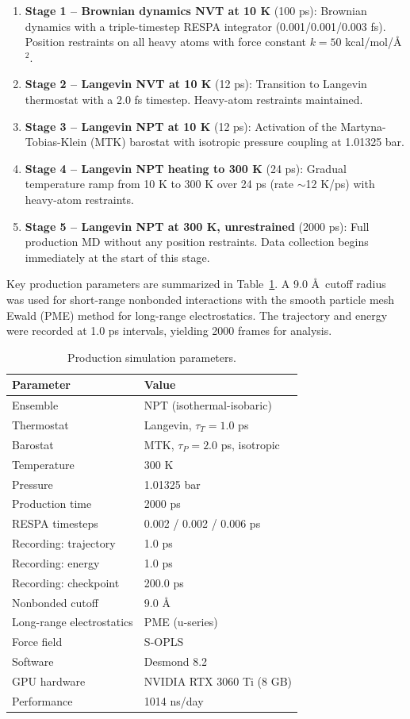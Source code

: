 \documentclass[twocolumn,10pt]{article}
\begin{document}
\begin{enumerate}[nosep]
    \item \textbf{Stage 1 -- Brownian dynamics NVT at 10 K} (100 ps): Brownian dynamics with a triple-timestep RESPA integrator (0.001/0.001/0.003 fs). Position restraints on all heavy atoms with force constant $k = 50$ kcal/mol/\AA$^2$.
    \item \textbf{Stage 2 -- Langevin NVT at 10 K} (12 ps): Transition to Langevin thermostat with a 2.0 fs timestep. Heavy-atom restraints maintained.
    \item \textbf{Stage 3 -- Langevin NPT at 10 K} (12 ps): Activation of the Martyna-Tobias-Klein (MTK) barostat with isotropic pressure coupling at 1.01325 bar.
    \item \textbf{Stage 4 -- Langevin NPT heating to 300 K} (24 ps): Gradual temperature ramp from 10 K to 300 K over 24 ps (rate $\sim$12 K/ps) with heavy-atom restraints.
    \item \textbf{Stage 5 -- Langevin NPT at 300 K, unrestrained} (2000 ps): Full production MD without any position restraints. Data collection begins immediately at the start of this stage.
\end{enumerate}

Key production parameters are summarized in Table~\ref{tab:params}. A 9.0 \AA\ cutoff radius was used for short-range nonbonded interactions with the smooth particle mesh Ewald (PME) method for long-range electrostatics. The trajectory and energy were recorded at 1.0 ps intervals, yielding 2000 frames for analysis.

\begin{table}[!ht]
\centering
\caption{Production simulation parameters.}
\label{tab:params}
\begin{tabular}{p{}p{}}
\toprule
Parameter & Value \\
\midrule
Ensemble & NPT (isothermal-isobaric) \\
Thermostat & Langevin, $\tau_T = 1.0$ ps \\
Barostat & MTK, $\tau_P = 2.0$ ps, isotropic \\
Temperature & 300 K \\
Pressure & 1.01325 bar \\
Production time & 2000 ps \\
RESPA timesteps & 0.002 / 0.002 / 0.006 ps \\
Recording: trajectory & 1.0 ps \\
Recording: energy & 1.0 ps \\
Recording: checkpoint & 200.0 ps \\
Nonbonded cutoff & 9.0 \AA \\
Long-range electrostatics & PME (u-series) \\
Force field & S-OPLS \\
Software & Desmond 8.2 \\
GPU hardware & NVIDIA RTX 3060 Ti (8 GB) \\
Performance & 1014 ns/day \\
\bottomrule
\end{tabular}
\end{table}
\end{document}
